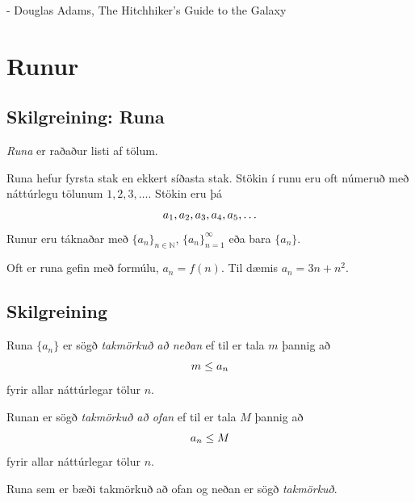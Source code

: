 \documentclass[b5paper,10pt,icelandic]{sphinxmanual}
\begin{document}
- Douglas Adams, The Hitchhiker's Guide to the Galaxy


\section{Runur}
\label{kafli09:index-0}\label{kafli09:runur}

\subsection{Skilgreining: Runa}
\label{kafli09:skilgreining-runa}
\emph{Runa} er raðaður listi af tölum.

Runa hefur fyrsta stak en ekkert síðasta stak. Stökin í runu eru oft
númeruð með náttúrlegu tölunum \(1, 2, 3, \ldots\). Stökin eru þá
\begin{gather}
\begin{split}a_1, a_2, a_3, a_4, a_5, \ldots\end{split}\notag
\end{gather}
Runur eru táknaðar með \(\{a_n\}_{n\in {{{\mathbb  N}}}}\),
\(\{a_n\}_{n=1}^\infty\) eða bara \(\{a_n\}\).

Oft er runa gefin með formúlu, \(a_n = f(n)\). Til dæmis
\(a_n = 3n + n^2\).


\subsection{Skilgreining}
\label{kafli09:index-1}\label{kafli09:skilgreining}
Runa \(\{a_n\}\) er sögð \emph{takmörkuð að neðan} ef til er tala
\(m\) þannig að
\begin{gather}
\begin{split}m\leq a_n\end{split}\notag
\end{gather}
fyrir allar náttúrlegar tölur \(n\).

Runan er sögð \emph{takmörkuð að ofan} ef til er tala \(M\) þannig að
\begin{gather}
\begin{split}a_n\leq M\end{split}\notag
\end{gather}
fyrir allar náttúrlegar tölur \(n\).

Runa sem er bæði takmörkuð að ofan og neðan er sögð \emph{takmörkuð}.

\end{document}
